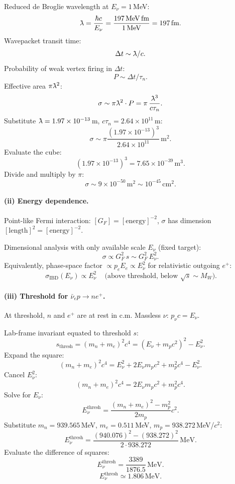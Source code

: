 \documentclass[11pt]{article}
\newcommand{\lambdabar}{\ensuremath{\mathchar'26\mkern-9mu\lambda}}
\begin{document}
Reduced de Broglie wavelength at $E_\nu=1$\,MeV:
\[
\lambdabar = \frac{\hbar c}{E_\nu} = \frac{197\,\mathrm{MeV\,fm}}{1\,\mathrm{MeV}}=197\,\mathrm{fm}.
\]
Wavepacket transit time:
\[
\Delta t\sim \lambdabar/c.
\]
Probability of weak vertex firing in $\Delta t$:
\[
P\sim \Delta t/\tau_n.
\]
Effective area $\pi\lambdabar^2$:
\[
\sigma\sim \pi\lambdabar^2\cdot P=\pi\,\frac{\lambdabar^3}{c\tau_n}.
\]
Substitute $\lambdabar=1.97\times 10^{-13}$\,m, $c\tau_n=2.64\times 10^{11}$\,m:
\[
\sigma\sim \pi\frac{(1.97\times 10^{-13})^3}{2.64\times 10^{11}}\,\mathrm{m^2}.
\]
Evaluate the cube:
\[
(1.97\times 10^{-13})^3=7.65\times 10^{-39}\,\mathrm{m^3}.
\]
Divide and multiply by $\pi$:
\[
\boxed{\;\sigma\sim 9\times 10^{-50}\,\mathrm{m^2}\sim 10^{-45}\,\mathrm{cm^2}.\;}
\]

\paragraph{(ii) Energy dependence.}
Point-like Fermi interaction: $[G_F]=[\text{energy}]^{-2}$, $\sigma$ has dimension $[\text{length}]^2=[\text{energy}]^{-2}$.

Dimensional analysis with only available scale $E_\nu$ (fixed target):
\[
\sigma\propto G_F^2\,s\sim G_F^2\,E_\nu^2.
\]
Equivalently, phase-space factor $\propto p_e E_e\propto E_\nu^2$ for relativistic outgoing $e^+$:
\[
\boxed{\,\sigma_\mathrm{IBD}(E_\nu)\propto E_\nu^2\,}\quad\text{(above threshold, below }\sqrt s\sim M_W\text{).}
\]

\paragraph{(iii) Threshold for $\bar\nu_e p\to n e^+$.}
At threshold, $n$ and $e^+$ are at rest in c.m. Massless $\nu$: $p_\nu c=E_\nu$.

Lab-frame invariant equated to threshold $s$:
\[
s_\mathrm{thresh}=(m_n+m_e)^2 c^4=(E_\nu+m_p c^2)^2-E_\nu^2.
\]
Expand the square:
\[
(m_n+m_e)^2 c^4=E_\nu^2+2 E_\nu m_p c^2+m_p^2 c^4-E_\nu^2.
\]
Cancel $E_\nu^2$:
\[
(m_n+m_e)^2 c^4=2 E_\nu m_p c^2+m_p^2 c^4.
\]
Solve for $E_\nu$:
\[
E_\nu^\mathrm{thresh}=\frac{(m_n+m_e)^2-m_p^2}{2 m_p}c^2.
\]
Substitute $m_n=939.565$\,MeV, $m_e=0.511$\,MeV, $m_p=938.272$\,MeV/$c^2$:
\[
E_\nu^\mathrm{thresh}=\frac{(940.076)^2-(938.272)^2}{2\cdot 938.272}\,\mathrm{MeV}.
\]
Evaluate the difference of squares:
\[
E_\nu^\mathrm{thresh}=\frac{3389}{1876.5}\,\mathrm{MeV}.
\]
\[
\boxed{\;E_\nu^\mathrm{thresh}\simeq 1.806\,\mathrm{MeV}.\;}
\]
\end{document}
